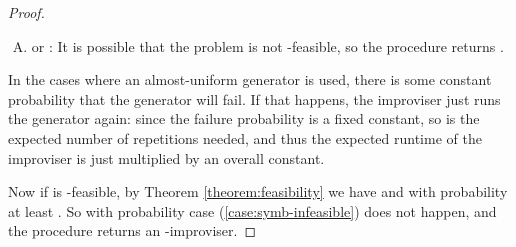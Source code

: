 \documentclass[a4paper,USenglish,numberwithinsect]{lipics}
\theoremstyle{plain}
\theoremstyle{definition}
\begin{document}
\begin{proof}
\begin{enumerate}[(A)]
\item  or : It is possible that the problem is not -feasible, so the procedure returns .
\end{enumerate}
In the cases where an almost-uniform generator is used, there is some constant probability that the generator will fail. If that happens, the improviser just runs the generator again: since the failure probability is a fixed constant, so is the expected number of repetitions needed, and thus the expected runtime of the improviser is just multiplied by an overall constant.

Now if  is -feasible, by Theorem \ref{theorem:feasibility} we have  and  with probability at least . So with probability  case (\ref{case:symb-infeasible}) does not happen, and the procedure returns an -improviser.
\end{proof}
\end{document}
